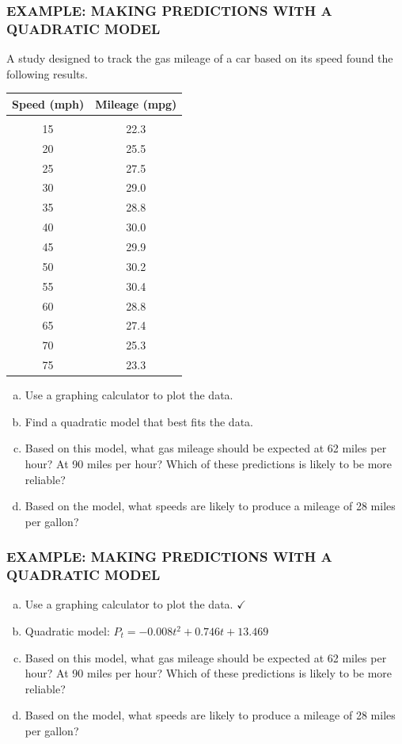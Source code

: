 \documentclass[8pt]{beamer}
\newcommand{\extitle}[1]{\frametitle{\fontfamily{fvs}\selectfont \small\color{black!70!blue!80!cyan}\uppercase{\bfseries Example: #1}}}
\def\solblank{\begin{tcolorbox}[colframe=black!50!blue!50!cyan,
colback=white,
bottomrule=0mm,
rightrule=0mm,
sharp corners=all] 
\vspace{6in}
\text{}
\end{tcolorbox}}
\begin{document}
\begin{frame}
\extitle{Making Predictions with a Quadratic Model}
A study designed to track the gas mileage of a car based on its speed found the following results.
\begin{center}
\begin{tabular}{c c}
\textbf{Speed (mph)} & \textbf{Mileage (mpg)}\\
\hline
& \\
15 & 22.3\\
20 & 25.5\\
25 & 27.5\\
30 & 29.0\\
35 & 28.8\\
40 & 30.0\\
45 & 29.9\\
50 & 30.2\\
55 & 30.4\\
60 & 28.8\\
65 & 27.4\\
70 & 25.3\\
75 & 23.3
\end{tabular}
\end{center}

\begin{enumerate}[(a)]
\item Use a graphing calculator to plot the data.
\item Find a quadratic model that best fits the data.
\item Based on this model, what gas mileage should be expected at 62 miles per hour?  At 90 miles per hour?  Which of these predictions is likely to be more reliable?
\item Based on the model, what speeds are likely to produce a mileage of 28 miles per gallon?
\end{enumerate}
\vspace{1in}
\text{}
\end{frame}

\begin{frame}
\extitle{Making Predictions with a Quadratic Model}
\begin{enumerate}[(a)]
\item Use a graphing calculator to plot the data. $\checkmark$
\item Quadratic model: $P_t = -0.008t^2 + 0.746t + 13.469$
\item Based on this model, what gas mileage should be expected at 62 miles per hour?  At 90 miles per hour?  Which of these predictions is likely to be more reliable?
\item Based on the model, what speeds are likely to produce a mileage of 28 miles per gallon?
\end{enumerate}

\solblank
\end{frame}
\end{document}
